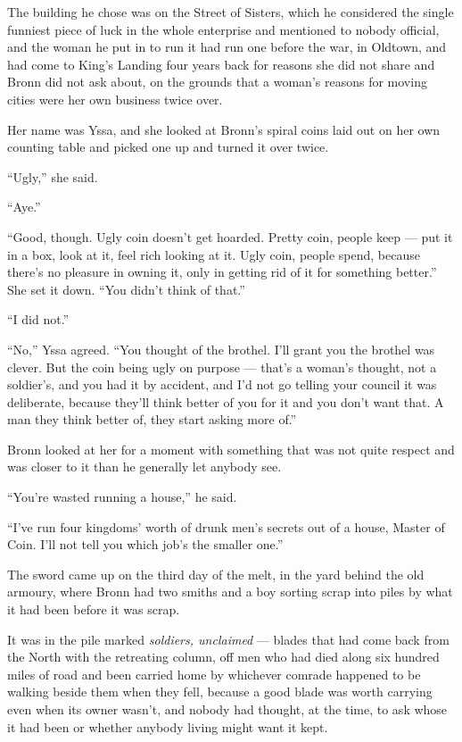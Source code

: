 The building he chose was on the Street of Sisters, which he considered the single funniest piece of luck in the whole enterprise and mentioned to nobody official, and the woman he put in to run it had run one before the war, in Oldtown, and had come to King’s Landing four years back for reasons she did not share and Bronn did not ask about, on the grounds that a woman’s reasons for moving cities were her own business twice over.

Her name was Yssa, and she looked at Bronn’s spiral coins laid out on her own counting table and picked one up and turned it over twice.

“Ugly,” she said.

“Aye.”

“Good, though. Ugly coin doesn’t get hoarded. Pretty coin, people keep — put it in a box, look at it, feel rich looking at it. Ugly coin, people spend, because there’s no pleasure in owning it, only in getting rid of it for something better.” She set it down. “You didn’t think of that.”

“I did not.”

“No,” Yssa agreed. “You thought of the brothel. I’ll grant you the brothel was clever. But the coin being ugly on purpose — that’s a woman’s thought, not a soldier’s, and you had it by accident, and I’d not go telling your council it was deliberate, because they’ll think better of you for it and you don’t want that. A man they think better of, they start asking more of.”

Bronn looked at her for a moment with something that was not quite respect and was closer to it than he generally let anybody see.

“You’re wasted running a house,” he said.

“I’ve run four kingdoms’ worth of drunk men’s secrets out of a house, Master of Coin. I’ll not tell you which job’s the smaller one.”

\sceneBreak

The sword came up on the third day of the melt, in the yard behind the old armoury, where Bronn had two smiths and a boy sorting scrap into piles by what it had been before it was scrap.

It was in the pile marked \textit{soldiers, unclaimed} — blades that had come back from the North with the retreating column, off men who had died along six hundred miles of road and been carried home by whichever comrade happened to be walking beside them when they fell, because a good blade was worth carrying even when its owner wasn’t, and nobody had thought, at the time, to ask whose it had been or whether anybody living might want it kept.

